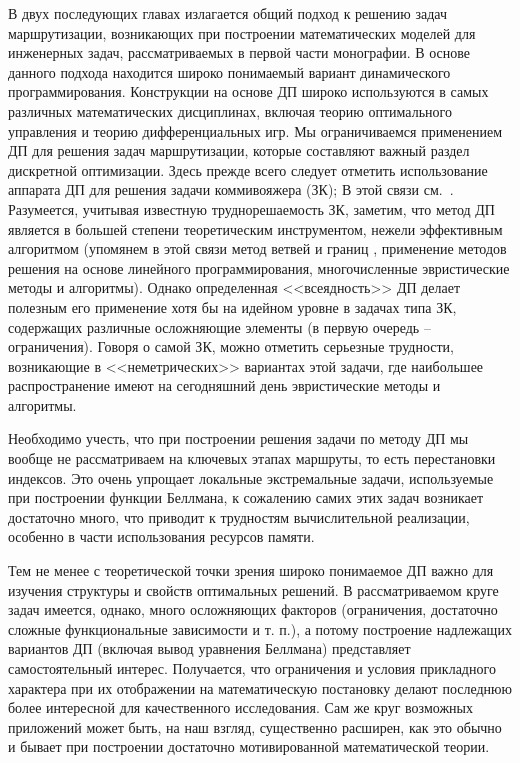 \documentclass[11pt,twoside,openany]{report}
\begin{document}
В двух последующих главах излагается общий подход к решению задач маршрутизации,
возникающих при построении математических моделей для инженерных задач, рассматриваемых
в первой части монографии.
В основе данного подхода находится широко понимаемый вариант
динамического программирования.
Конструкции на основе ДП широко используются в самых
различных математических дисциплинах, включая теорию оптимального управления и теорию
дифференциальных игр.
Мы ограничиваемся применением ДП для решения задач маршрутизации,
которые составляют важный раздел дискретной оптимизации.
Здесь прежде всего следует отметить
использование аппарата ДП  для решения задачи коммивояжера (ЗК);
В этой связи
см.~\cite{Cha4`,Cha16`}.
Разумеется, учитывая известную труднорешаемость ЗК,
заметим, что
метод ДП является в большей степени теоретическим инструментом,
нежели эффективным
алгоритмом
(упомянем в этой связи метод ветвей и границ \cite{Cha17`},
применение методов решения на основе линейного программирования,
многочисленные эвристические методы и алгоритмы).
Однако определенная <<всеядность>> ДП делает полезным его применение
хотя бы на идейном уровне в задачах типа ЗК,
содержащих различные  осложняющие
элементы (в первую очередь -- ограничения).
Говоря о самой ЗК, можно отметить серьезные трудности,
возникающие в <<неметрических>> вариантах этой задачи,
где наибольшее
распространение имеют на сегодняшний день эвристические методы и алгоритмы.

Необходимо учесть,
что при построении решения задачи по методу ДП
мы вообще не
рассматриваем на ключевых этапах маршруты,
то есть перестановки  индексов.
Это очень упрощает локальные экстремальные задачи,
используемые при построении функции Беллмана,
к сожалению самих этих задач возникает
достаточно много, что приводит к трудностям
вычислительной реализации,
особенно в части использования ресурсов памяти.

Тем не менее с теоретической точки зрения широко понимаемое ДП важно для изучения
структуры и свойств оптимальных решений.
В рассматриваемом круге задач имеется, однако,
много осложняющих факторов
(ограничения, достаточно сложные функциональные зависимости
и т. п.),
а потому построение надлежащих вариантов ДП
(включая вывод уравнения Беллмана)
представляет самостоятельный интерес.
Получается, что ограничения и условия прикладного
характера при их отображении на математическую постановку
делают последнюю более интересной
для качественного исследования.
Сам же круг возможных приложений может быть,
на наш взгляд,
существенно расширен,
как это обычно и бывает при построении достаточно мотивированной
математической теории.
\end{document}
